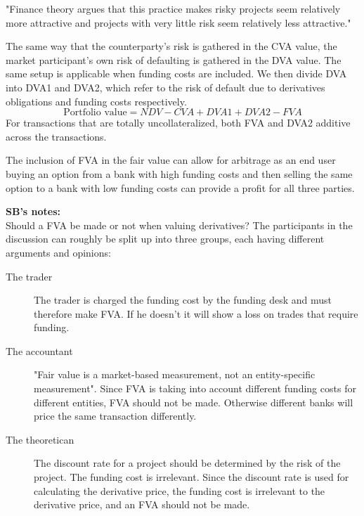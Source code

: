 \documentclass[10pt,a4paper]{article}
\begin{document}
        "Finance theory argues that this practice makes risky projects seem relatively more attractive and projects with very little risk seem relatively less attractive."

        The same way that the counterparty's risk is gathered in the CVA value, the market participant's own risk of defaulting is gathered in the DVA value. The same setup is applicable when funding costs are included. We then divide DVA into DVA1 and DVA2, which refer to the risk of default due to derivatives obligations and funding costs respectively.
        \begin{equation}
            \text{Portfolio value} = NDV - CVA + DVA1 + DVA2 - FVA
        \end{equation}
        For transactions that are totally uncollateralized, both FVA and DVA2 additive across the transactions. 

        The inclusion of FVA in the fair value can allow for arbitrage as an end user buying an option from a bank with high funding costs and then selling the same option to a bank with low funding costs can provide a profit for all three parties.

        \textbf{SB's notes:} \\
        Should a FVA be made or not when valuing derivatives? The participants in the discussion can roughly be split up into three groups, each having different arguments and opinions:

        \begin{description}
            \item[The trader] The trader is charged the funding cost by the funding desk and must therefore make FVA. If he doesn't it will show a loss on trades that require funding.
            
            \item[The accountant] "Fair value is a market-based measurement, not an entity-specific measurement". Since FVA is taking into account different funding costs for different entities, FVA should not be made. Otherwise different banks will price the same transaction differently.
            
            \item[The theoretican] The discount rate for a project should be determined by the risk of the project. The funding cost is irrelevant. Since the discount rate is used for calculating the derivative price, the funding cost is irrelevant to the derivative price, and an FVA should not be made.
        \end{description}
\end{document}
